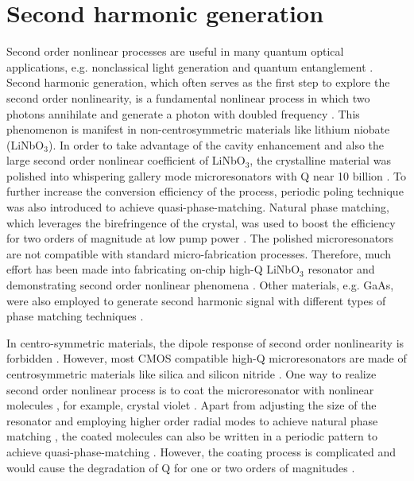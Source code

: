 \section{Second harmonic generation}
Second order nonlinear processes are useful in many quantum optical applications, e.g. nonclassical light generation \cite{scully1999quantum} and quantum entanglement \cite{xu2008second}. Second harmonic generation, which often serves as the first step to explore the second order nonlinearity, is a fundamental nonlinear process in which two photons annihilate and generate a photon with doubled frequency \cite{boyd2003nonlinear}. This phenomenon is manifest in non-centrosymmetric materials like lithium niobate (LiNbO$_3$). In order to take advantage of the cavity enhancement and also the large second order nonlinear coefficient of LiNbO$_3$, the crystalline material was polished into whispering gallery mode microresonators with Q near 10 billion \cite{ilchenko2004nonlinear}. To further increase the conversion efficiency of the process, periodic poling technique was also introduced to achieve quasi-phase-matching. Natural phase matching, which leverages the birefringence of the crystal, was used to boost the efficiency for two orders of magnitude at low pump power \cite{furst2010naturally}. The polished microresonators are not compatible with standard micro-fabrication processes. Therefore, much effort has been made into fabricating on-chip high-Q LiNbO$_3$ resonator and demonstrating second order nonlinear phenomena \cite{lin2015second}. Other materials, e.g. GaAs, were also employed to generate second harmonic signal with different types of phase matching techniques \cite{kuo2014second}. 

In centro-symmetric materials, the dipole response of second order nonlinearity is forbidden \cite{boyd2003nonlinear}. However, most CMOS compatible high-Q microresonators are made of centrosymmetric materials like silica \cite{armani2003ultra, kippenberg2003fabrication} and silicon nitride \cite{levy2011harmonic}. One way to realize second order nonlinear process is to coat the microresonator with nonlinear molecules \cite{xu2008second}, for example, crystal violet \cite{dominguez2011whispering}. Apart from adjusting the size of the resonator and employing higher order radial modes to achieve natural phase matching \cite{xu2008second}, the coated molecules can also be written in a periodic pattern to achieve quasi-phase-matching \cite{dominguez2011whispering}. However, the coating process is complicated and would cause the degradation of Q for one or two orders of magnitudes \cite{xu2008second}. 

